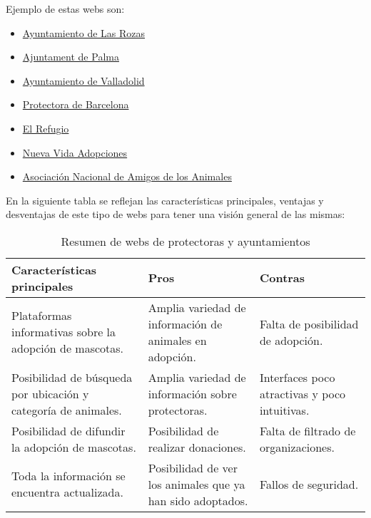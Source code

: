 Ejemplo de estas webs son:

\begin{itemize}
    \item \href{https://www.lasrozas.es/sanidad-y-servicios-sociales/adoptar-animales}{Ayuntamiento de Las Rozas}
    \item \href{https://csmpa.palma.cat/portal/PALMA/csmpa/contenedor1.jsp?seccion=s_fdes_d4_v1.jsp&codbusqueda=1720&language=es&codResi=1&layout=contenedor1.jsp&codAdirecto=981}{Ajuntament de Palma}
    \item \href{https://www.valladolid.es/es/programa-adopta}{Ayuntamiento de Valladolid}
    \item \href{https://protectorabcn.es/adopta/}{Protectora de Barcelona}
    \item \href{https://elrefugio.org/adopta/}{El Refugio}
    \item \href{https://nuevavida-adopciones.org/}{Nueva Vida Adopciones}
    \item \href{https://www.anaaweb.org/}{Asociación Nacional de Amigos de los Animales}
\end{itemize}

En la siguiente tabla se reflejan las características principales, ventajas y desventajas de este tipo de webs
para tener una visión general de las mismas: \\

\begin{table}[h]
\centering
\begin{tabular}{|p{6cm}|p{4cm}|p{4cm}|}
\hline
\textbf{Características principales} & \textbf{Pros} & \textbf{Contras} \\
\hline
Plataformas informativas sobre la adopción de mascotas. &
Amplia variedad de información de animales en adopción. &
Falta de posibilidad de adopción. \\
\hline
Posibilidad de búsqueda por ubicación y categoría de animales. &
Amplia variedad de información sobre protectoras. &
Interfaces poco atractivas y poco intuitivas. \\
\hline
Posibilidad de difundir la adopción de mascotas. &
Posibilidad de realizar donaciones. &
Falta de filtrado de organizaciones. \\
\hline
Toda la información se encuentra actualizada. &
Posibilidad de ver los animales que ya han sido adoptados. &
Fallos de seguridad. \\
\hline
\end{tabular}
\caption{Resumen de webs de protectoras y ayuntamientos}
\label{tab:protectoras-ayuntamientos}
\end{table}


